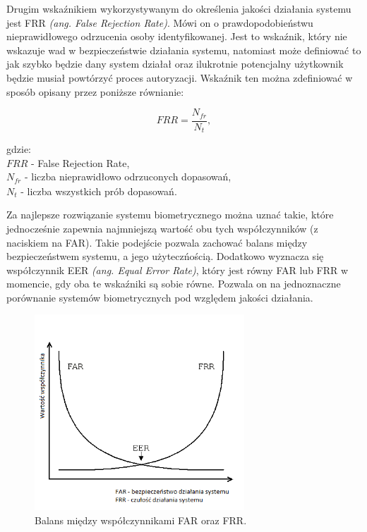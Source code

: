 Drugim wska\'znikiem wykorzystywanym do określenia jakości działania systemu jest FRR \textit{(ang. False Rejection Rate)}.
Mówi on o prawdopodobieństwu nieprawidłowego odrzucenia osoby identyfikowanej. Jest to wska\'znik, który
nie wskazuje wad w bezpieczeństwie działania systemu, natomiast może definiowa\'c to jak
szybko będzie dany system działał oraz ilukrotnie potencjalny użytkownik będzie musiał powtórzy\'c
proces autoryzacji. Wska\'znik ten można zdefiniowa\'c w sposób opisany przez poniższe równianie:

\begin{equation}
  \mathit{FRR} = \frac{N_{\mathit{fr}}}{N_{t}},
\end{equation}

\noindent
gdzie:\\
\indent $\mathit{FRR}$ - False Rejection Rate,\\
\indent $N_{\mathit{fr}}$ - liczba nieprawidłowo odrzuconych dopasowań,\\
\indent $N_{t}$ - liczba wszystkich prób dopasowań.\newline

Za najlepsze rozwiązanie systemu biometrycznego można uzna\'c takie, które jednocześnie zapewnia
najmniejszą wartoś\'c obu tych współczynników (z naciskiem na FAR). Takie podejście pozwala zachowa\'c balans między bezpieczeństwem
systemu, a jego użyteczńością. Dodatkowo wyznacza się współczynnik EER \textit{(ang. Equal Error Rate)}, który jest równy
FAR lub FRR w momencie, gdy oba te wska\'zniki są sobie równe. Pozwala on na jednoznaczne porównanie systemów
biometrycznych pod względem jakości działania.

\begin{figure}[ht]
  \centering
  \includegraphics[width=0.7\textwidth]{images/experiment/FARFRRERR.png}
  \caption{Balans między współczynnikami FAR oraz FRR.}
\end{figure}

